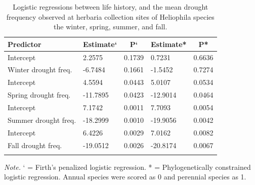 \documentclass[man,floatsintext]{apa6}
\theoremstyle{definition}
\theoremstyle{definition}
\theoremstyle{definition}
\theoremstyle{remark}
\begin{document}
\begin{table}[tbp]
\begin{center}
\begin{threeparttable}
\caption{\label{tab:modelstable}Logistic regressions between life history, and the mean drought frequency observed at herbaria collection sites of Heliophila species the winter, spring, summer, and fall.}
\begin{tabular}{lllll}
\toprule
Predictor & \multicolumn{1}{c}{Estimate`} & \multicolumn{1}{c}{P`} & \multicolumn{1}{c}{Estimate*} & \multicolumn{1}{c}{P*}\\
\midrule
Intercept & 2.2575 & 0.1739 & 0.7231 & 0.6636\\
Winter drought freq. & -6.7484 & 0.1661 & -1.5452 & 0.7274\\ \midrule
Intercept & 4.5594 & 0.0443 & 5.0107 & 0.0534\\
Spring drought freq. & -11.7895 & 0.0423 & -12.9014 & 0.0464\\ \midrule
Intercept & 7.1742 & 0.0011 & 7.7093 & 0.0054\\
Summer drought freq. & -18.2999 & 0.0010 & -19.9056 & 0.0042\\ \midrule
Intercept & 6.4226 & 0.0029 & 7.0162 & 0.0082\\
Fall drought freq. & -19.0512 & 0.0026 & -20.8174 & 0.0067\\ \midrule
\bottomrule
\addlinespace
\end{tabular}
\begin{tablenotes}[para]
\normalsize{\textit{Note.} ` = Firth's penalized logistic regression. * = Phylogenetically constrained logistic regression. Annual species were scored as 0 and perennial species as 1.}
\end{tablenotes}
\end{threeparttable}
\end{center}
\end{table}
\end{document}
